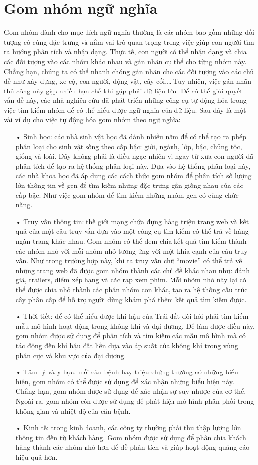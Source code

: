 \section{Gom nhóm ngữ nghĩa}
Gom nhóm dành cho mục đích ngữ nghĩa thường là các nhóm bao gồm những đối tượng có cùng đặc trưng và nắm vai trò quan trọng trong việc giúp con người tìm ra hướng phân tích và nhận dạng.
Thực tế, con người có thể nhận dạng và chia các đối tượng vào các nhóm khác nhau và gán nhãn cụ thể cho từng nhóm này.
Chẳng hạn, chúng ta có thể nhanh chóng gán nhãn cho các đối tượng vào các chủ đề như xây dựng, xe cộ, con người, động vật, cây cối,\ldots
Tuy nhiên, việc gán nhãn thủ công này gặp nhiều hạn chế khi gặp phải dữ liệu lớn.
Để có thể giải quyết vấn đề này, các nhà nghiên cứu đã phát triển những công cụ tự động hóa trong việc tìm kiếm nhóm để có thể hiểu được ngữ nghĩa của dữ liệu.
Sau đây là một vài ví dụ cho việc tự động hóa gom nhóm theo ngữ nghĩa:
\begin{enumerate}
\item[•]Sinh học: các nhà sinh vật học đã dành nhiều năm để có thể tạo ra phép phân loại cho sinh vật sống theo cấp bậc: giới, ngành, lớp, bậc, chủng tộc, giống và loài.
Đây không phải là điều ngạc nhiên vì ngay từ xưa con người đã phân tích để tạo ra hệ thống phân loại này.
Dựa vào hệ thống phân loại này, các nhà khoa học đã áp dụng các cách thức gom nhóm để phân tích số lượng lớn thông tin về gen để tìm kiếm những đặc trưng gần giống nhau của các cấp bậc.
Như việc gom nhóm để tìm kiếm những nhóm gen có cùng chức năng.
\item[•]Truy vấn thông tin: thế giới mạng chứa đựng hàng triệu trang web và kết quả của một câu truy vấn dựa vào một công cụ tìm kiếm có thể trả về hàng ngàn trang khác nhau.
Gom nhóm có thể đem chia kết quả tìm kiếm thành các nhóm nhỏ với mỗi nhóm nhỏ tương ứng với một khía cạnh của câu truy vấn.
Như trong trường hợp này, khi ta truy vấn chữ ``movie'' có thể trả về những trang web đã được gom nhóm thành các chủ đề khác nhau như: đánh giá, trailers, điểm xếp hạng và các rạp xem phim.
Mỗi nhóm nhỏ này lại có thể được chia nhỏ thành các phân nhóm con khác, tạo ra hệ thống cấu trúc cây phân cấp để hỗ trợ người dùng khám phá thêm kết quả tìm kiếm được.
\item[•]Thời tiết: để có thể hiểu được khí hậu của Trái đất đòi hỏi phải tìm kiếm mẫu mô hình hoạt động trong không khí và đại dương.
Để làm được điều này, gom nhóm được sử dụng để phân tích và tìm kiếm các mẫu mô hình mà có tác động đến khí hậu đất liền dựa vào áp suất của không khí trong vùng phân cực và khu vực của đại dương.
\item[•]Tâm lý và y học: mỗi căn bệnh hay triệu chứng thường có những biểu hiện, gom nhóm có thể được sử dụng để xác nhận những biểu hiện này.
Chẳng hạn, gom nhóm được sử dụng để xác nhận sự suy nhược của cơ thể.
Ngoài ra, gom nhóm còn được sử dụng để phát hiện mô hình phân phối trong không gian và nhiệt độ của căn bệnh.
\item[•]Kinh tế: trong kinh doanh, các công ty thường phải thu thập lượng lớn thông tin đến từ khách hàng.
Gom nhóm được sử dụng để phân chia khách hàng thành các nhóm nhỏ hơn để dễ phân tích và giúp hoạt động quảng cáo hiệu quả hơn.
\end{enumerate}

